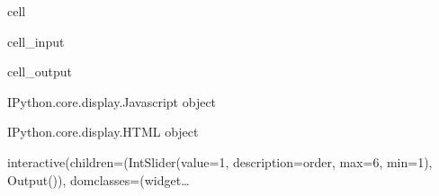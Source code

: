 \documentclass[letterpaper,10pt,english]{jupyterBook}
\begin{document}
\begin{sphinxuseclass}{cell}\begin{sphinxVerbatimInput}

\begin{sphinxuseclass}{cell_input}
\begin{sphinxVerbatim}[commandchars=\\\{\}]
     
     
 
\end{sphinxVerbatim}

\end{sphinxuseclass}\end{sphinxVerbatimInput}
\begin{sphinxVerbatimOutput}

\begin{sphinxuseclass}{cell_output}
\begin{sphinxVerbatim}[commandchars=\\\{\}]
\PYGZlt{}IPython.core.display.Javascript object\PYGZgt{}
\end{sphinxVerbatim}

\begin{sphinxVerbatim}[commandchars=\\\{\}]
\PYGZlt{}IPython.core.display.HTML object\PYGZgt{}
\end{sphinxVerbatim}

\begin{sphinxVerbatim}[commandchars=\\\{\}]
interactive(children=(IntSlider(value=1, description=\PYGZsq{}order\PYGZsq{}, max=6, min=1), Output()), \PYGZus{}dom\PYGZus{}classes=(\PYGZsq{}widget\PYGZhy{}…
\end{sphinxVerbatim}

\end{sphinxuseclass}\end{sphinxVerbatimOutput}

\end{sphinxuseclass}
\end{document}
